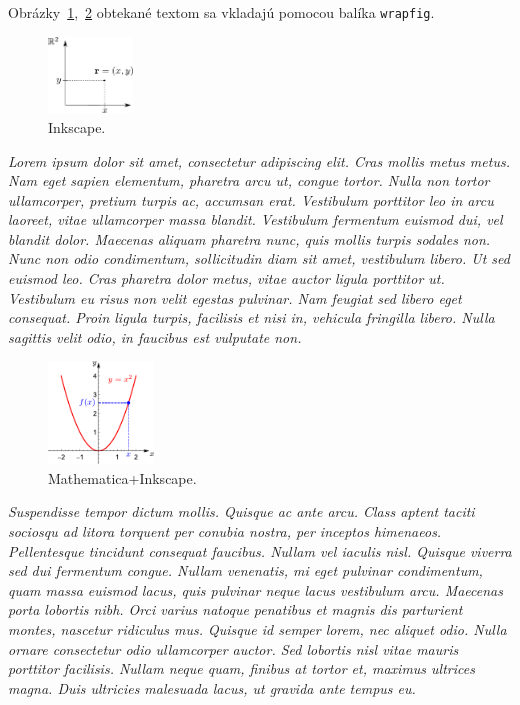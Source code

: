 Obrázky~\ref{fig:bod_v_rovine},~\ref{fig:parabola} obtekané textom sa vkladajú pomocou balíka \verb|wrapfig|.

\begin{figure}
	\centering
	\includegraphics[width=0.2\textwidth]{bod_v_rovine}
	\caption{Inkscape.}
	\label{fig:bod_v_rovine}
\end{figure}
\textit{Lorem ipsum dolor sit amet, consectetur adipiscing elit. Cras mollis metus metus. Nam eget sapien elementum, pharetra arcu ut, congue tortor. Nulla non tortor ullamcorper, pretium turpis ac, accumsan erat. Vestibulum porttitor leo in arcu laoreet, vitae ullamcorper massa blandit. Vestibulum fermentum euismod dui, vel blandit dolor. Maecenas aliquam pharetra nunc, quis mollis turpis sodales non. Nunc non odio condimentum, sollicitudin diam sit amet, vestibulum libero. Ut sed euismod leo. Cras pharetra dolor metus, vitae auctor ligula porttitor ut. Vestibulum eu risus non velit egestas pulvinar. Nam feugiat sed libero eget consequat. Proin ligula turpis, facilisis et nisi in, vehicula fringilla libero. Nulla sagittis velit odio, in faucibus est vulputate non.}

\begin{figure}
	\centering
	\includegraphics[width=0.25\textwidth]{parabola}
	\caption{Mathematica+Inkscape.}
	\label{fig:parabola}
\end{figure}
\textit{Suspendisse tempor dictum mollis. Quisque ac ante arcu. Class aptent taciti sociosqu ad litora torquent per conubia nostra, per inceptos himenaeos. Pellentesque tincidunt consequat faucibus. Nullam vel iaculis nisl. Quisque viverra sed dui fermentum congue. Nullam venenatis, mi eget pulvinar condimentum, quam massa euismod lacus, quis pulvinar neque lacus vestibulum arcu. Maecenas porta lobortis nibh. Orci varius natoque penatibus et magnis dis parturient montes, nascetur ridiculus mus. Quisque id semper lorem, nec aliquet odio. Nulla ornare consectetur odio ullamcorper auctor. Sed lobortis nisl vitae mauris porttitor facilisis. Nullam neque quam, finibus at tortor et, maximus ultrices magna. Duis ultricies malesuada lacus, ut gravida ante tempus eu.}

